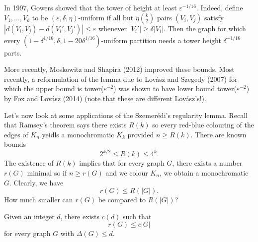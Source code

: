 \documentclass[a4paper]{article}
\begin{document}
In 1997, Gowers showed that the tower of height at least $\varepsilon^{-1/16}$. Indeed, define $V_1, \ldots, V_k$ to be $(\varepsilon, \delta, \eta)$-uniform if all but $\eta \binom{k}{2}$ pairs $(V_i, V_j)$ satisfy $|d(V_i, V_j) - d(V_i', V_j')| \leq \varepsilon$ whenever $|V_i'| \geq \delta |V_i|$. Then the graph for which every $(1 - \delta^{1/16}, \delta, 1 - 20 \delta^{1/16})$-uniform partition needs a tower height $\delta^{-1/16}$ parts.

More recently, Moskowitz and Shapira (2012) improved these bounds. Most recently, a reformulation of the lemma due to Lov\'asz and Szegedy (2007) for which the upper bound is tower($\varepsilon^{-2}$) was shown to have lower bound tower($\varepsilon^{-2}$) by Fox and Lov\'asz (2014) (note that these are different Lov\'asz's!).

Let's now look at some applications of the Szemer\'edi's regularity lemma. Recall that Ramsey's theorem says there exists $R(k)$ so every red-blue colouring of the edges of $K_n$ yeidls a monochromatic $K_k$ provided $n \geq R(k)$. There are known bounds
\[
  2^{k/2} \leq R(k) \leq 4^k.
\]
The existence of $R(k)$ implies that for every graph $G$, there exists a number $r(G)$ minimal so if $n \geq r(G)$ and we colour $K_n$, we obtain a monochromatic $G$. Clearly, we have
\[
  r(G) \leq R(|G|).
\]
How much smaller can $r(G)$ be compared to $R(|G|)$?

\begin{thm}
  Given an integer $d$, there exists $c(d)$ such that
  \[
    r(G) \leq c|G|
  \]
  for every graph $G$ with $\Delta(G) \leq d$.
\end{thm}
\end{document}
